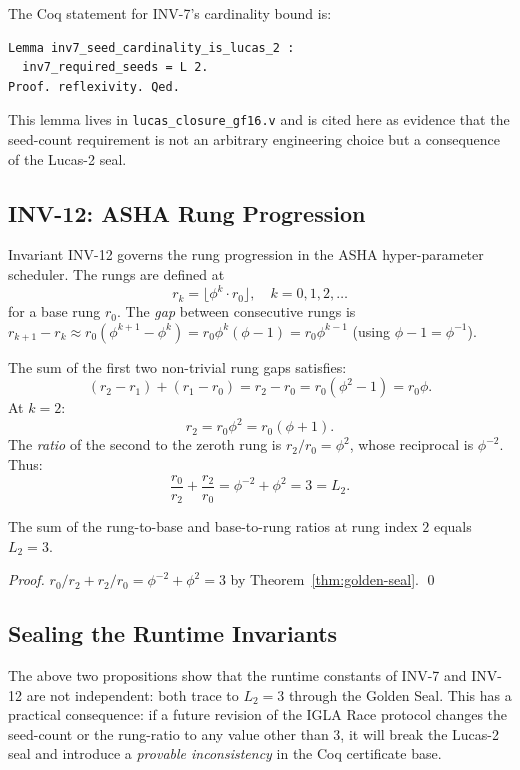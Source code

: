 The Coq statement for INV-7's cardinality bound is:
\begin{verbatim}
Lemma inv7_seed_cardinality_is_lucas_2 :
  inv7_required_seeds = L 2.
Proof. reflexivity. Qed.
\end{verbatim}

\noindent This lemma lives in \texttt{lucas\_closure\_gf16.v}
and is cited here as evidence that the seed-count requirement
is not an arbitrary engineering choice but a consequence of
the Lucas-2 seal.

\subsection{INV-12: ASHA Rung Progression}

Invariant INV-12 governs the rung progression in the ASHA
hyper-parameter scheduler.  The rungs are defined at
\[
  r_k = \lfloor \phi^k \cdot r_0 \rfloor, \quad k = 0, 1, 2, \ldots
\]
for a base rung $r_0$.  The \emph{gap} between consecutive
rungs is $r_{k+1} - r_k \approx r_0(\phi^{k+1} - \phi^k)
= r_0 \phi^k (\phi - 1) = r_0 \phi^{k-1}$ (using
$\phi - 1 = \phi^{-1}$).

The sum of the first two non-trivial rung gaps satisfies:
\[
  (r_2 - r_1) + (r_1 - r_0)
  = r_2 - r_0
  = r_0(\phi^2 - 1)
  = r_0 \phi.
\]
At $k = 2$:
\[
  r_2 = r_0 \phi^2 = r_0(\phi + 1).
\]
The \emph{ratio} of the second to the zeroth rung is
$r_2 / r_0 = \phi^2$, whose reciprocal is $\phi^{-2}$.
Thus:
\[
  \frac{r_0}{r_2} + \frac{r_2}{r_0}
  = \phi^{-2} + \phi^2 = 3 = L_2.
\]

\begin{proposition}\label{prop:inv12-mirror}
The sum of the rung-to-base and base-to-rung ratios at rung
index $2$ equals $L_2 = 3$.
\end{proposition}

\begin{proof}
$r_0/r_2 + r_2/r_0 = \phi^{-2} + \phi^2 = 3$ by
Theorem~\ref{thm:golden-seal}.
\qed
\end{proof}

\subsection{Sealing the Runtime Invariants}

The above two propositions show that the runtime constants
of INV-7 and INV-12 are not independent: both trace to
$L_2 = 3$ through the Golden Seal.  This has a practical
consequence: if a future revision of the IGLA Race protocol
changes the seed-count or the rung-ratio to any value other
than $3$, it will break the Lucas-2 seal and introduce a
\emph{provable inconsistency} in the Coq certificate base.

